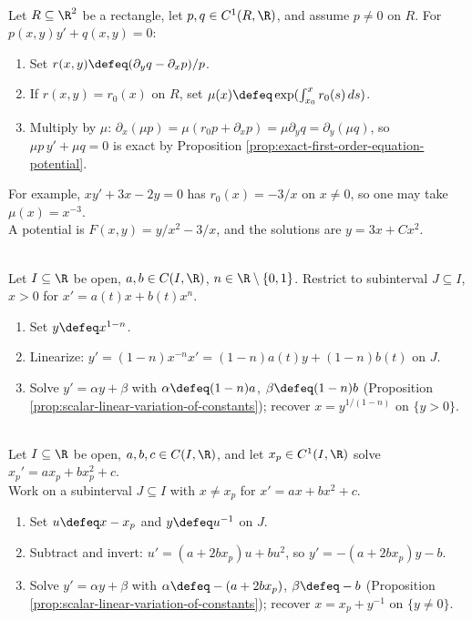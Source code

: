 \begin{method} \label{meth:integrating-factor-dependent-on-x} \\
Let $R\subseteq\R^2$ be a rectangle, let $p,q\in C^1(R,\R)$, and assume $p\neq0$ on $R$. For $p(x,y)y'+q(x,y)=0$:
\begin{enumerate}[label=(\roman*)]
\setlength{\itemsep}{0pt}
\item Set $r(x,y)\defeq(\partial_yq-\partial_xp)/p$.
\item If $r(x,y)=r_0(x)$ on $R$, set $\mu(x)\defeq\exp(\int_{x_0}^{x}r_0(s)\,ds)$.
\item Multiply by $\mu$: $\partial_x(\mu p)=\mu(r_0p+\partial_xp)=\mu\partial_yq=\partial_y(\mu q)$, so $\mu p\,y'+\mu q=0$ is exact by Proposition \ref{prop:exact-first-order-equation-potential}.
\end{enumerate}
For example, $xy'+3x-2y=0$ has $r_0(x)=-3/x$ on $x\neq0$, so one may take $\mu(x)=x^{-3}$.\\
A potential is $F(x,y)=y/x^2-3/x$, and the solutions are $y=3x+Cx^2$.
\end{method}

\begin{method} \label{meth:bernoulli-equation-linearization} \\
Let $I\subseteq\R$ be open, $a,b\in C(I,\R)$, $n\in\R\setminus\{0,1\}$. Restrict to subinterval $J\subseteq I$, $x>0$ for $x'=a(t)x+b(t)x^n$.
\begin{enumerate}[label=(\roman*)]
\setlength{\itemsep}{0pt}
\item Set $y\defeq x^{1-n}$.
\item Linearize: $y'=(1-n)x^{-n}x'=(1-n)a(t)y+(1-n)b(t)$ on $J$.
\item Solve $y'=\alpha y+\beta$ with $\alpha\defeq(1-n)a$, $\beta\defeq(1-n)b$ (Proposition \ref{prop:scalar-linear-variation-of-constants}); recover $x=y^{1/(1-n)}$ on $\{y>0\}$.
\end{enumerate}
\end{method}

\begin{method} \label{meth:riccati-equation-linearization} \\
Let $I\subseteq\R$ be open, $a,b,c\in C(I,\R)$, and let $x_p\in C^1(I,\R)$ solve $x_p'=ax_p+bx_p^2+c$.\\
Work on a subinterval $J\subseteq I$ with $x\neq x_p$ for $x'=ax+bx^2+c$.
\begin{enumerate}[label=(\roman*)]
\setlength{\itemsep}{0pt}
\item Set $u\defeq x-x_p$ and $y\defeq u^{-1}$ on $J$.
\item Subtract and invert: $u'=(a+2bx_p)u+bu^2$, so $y'=-(a+2bx_p)y-b$.
\item Solve $y'=\alpha y+\beta$ with $\alpha\defeq-(a+2bx_p)$, $\beta\defeq-b$ (Proposition \ref{prop:scalar-linear-variation-of-constants}); recover $x=x_p+y^{-1}$ on $\{y\neq0\}$.
\end{enumerate}
\end{method}

